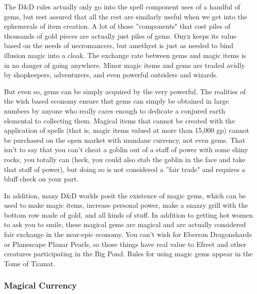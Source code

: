 The D\&D rules actually only go into the spell component uses of a handful of gems, but rest assured that all the rest are similarly useful when we get into the ephemerals of item creation. A lot of those ''components" that cost piles of thousands of gold pieces are actually just piles of gems. Onyx keeps its value based on the needs of necromancers, but amethyst is just as needed to bind illusion magic into a cloak. The exchange rate between gems and magic items is in no danger of going anywhere. Minor magic items and gems are traded avidly by shopkeepers, adventurers, and even powerful outsiders and wizards.

But even so, gems can be simply acquired by the very powerful. The realities of the wish based economy ensure that gems can simply be obtained in large numbers by anyone who really cares enough to dedicate a conjured earth elemental to collecting them. Magical items that cannot be created with the application of spells (that is, magic items valued at more than 15,000 gp) cannot be purchased on the open market with mundane currency, not even gems. That isn't to say that you can't cheat a goblin out of a staff of power with some shiny rocks, you totally can (heck, you could also stab the goblin in the face and take that staff of power), but doing so is not considered a ''fair trade" and requires a bluff check on your part.

In addition, many D\&D worlds posit the existence of magic gems, which can be used to make magic items, increase personal power, make a snazzy grill with the bottom row made of gold, and all kinds of stuff. In addition to getting hot women to ask you to smile, these magical gems are magical and are actually considered fair exchange in the near-epic economy. You can't wish for Eberron Dragonshards or Planescape Planar Pearls, so those things have real value to Efreet and other creatures participating in the Big Pond. Rules for using magic gems appear in the Tome of Tiamat.

\subsubsection{Magical Currency}

\listone


